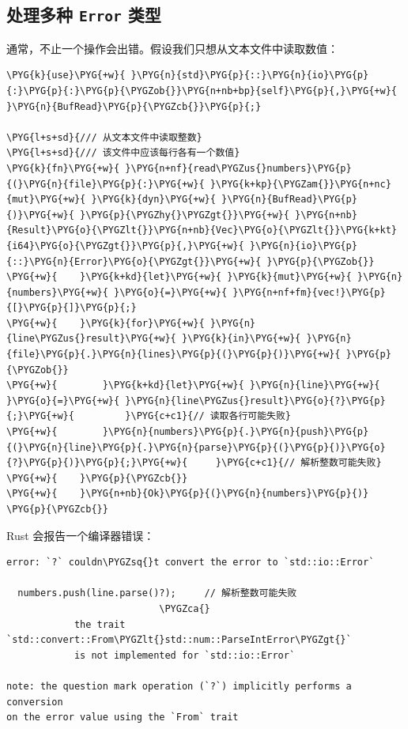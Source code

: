 \subsection{处理多种 \texttt{Error} 类型}

通常，不止一个操作会出错。假设我们只想从文本文件中读取数值：

\begin{Verbatim}[commandchars=\\\{\},breaklines=true,breakanywhere=true,fontsize=\codefont,xleftmargin=17bp]
\PYG{k}{use}\PYG{+w}{ }\PYG{n}{std}\PYG{p}{::}\PYG{n}{io}\PYG{p}{:}\PYG{p}{:}\PYG{p}{\PYGZob{}}\PYG{n+nb+bp}{self}\PYG{p}{,}\PYG{+w}{ }\PYG{n}{BufRead}\PYG{p}{\PYGZcb{}}\PYG{p}{;}

\PYG{l+s+sd}{/// 从文本文件中读取整数}
\PYG{l+s+sd}{/// 该文件中应该每行各有一个数值}
\PYG{k}{fn}\PYG{+w}{ }\PYG{n+nf}{read\PYGZus{}numbers}\PYG{p}{(}\PYG{n}{file}\PYG{p}{:}\PYG{+w}{ }\PYG{k+kp}{\PYGZam{}}\PYG{n+nc}{mut}\PYG{+w}{ }\PYG{k}{dyn}\PYG{+w}{ }\PYG{n}{BufRead}\PYG{p}{)}\PYG{+w}{ }\PYG{p}{\PYGZhy{}\PYGZgt{}}\PYG{+w}{ }\PYG{n+nb}{Result}\PYG{o}{\PYGZlt{}}\PYG{n+nb}{Vec}\PYG{o}{\PYGZlt{}}\PYG{k+kt}{i64}\PYG{o}{\PYGZgt{}}\PYG{p}{,}\PYG{+w}{ }\PYG{n}{io}\PYG{p}{::}\PYG{n}{Error}\PYG{o}{\PYGZgt{}}\PYG{+w}{ }\PYG{p}{\PYGZob{}}
\PYG{+w}{    }\PYG{k+kd}{let}\PYG{+w}{ }\PYG{k}{mut}\PYG{+w}{ }\PYG{n}{numbers}\PYG{+w}{ }\PYG{o}{=}\PYG{+w}{ }\PYG{n+nf+fm}{vec!}\PYG{p}{[}\PYG{p}{]}\PYG{p}{;}
\PYG{+w}{    }\PYG{k}{for}\PYG{+w}{ }\PYG{n}{line\PYGZus{}result}\PYG{+w}{ }\PYG{k}{in}\PYG{+w}{ }\PYG{n}{file}\PYG{p}{.}\PYG{n}{lines}\PYG{p}{(}\PYG{p}{)}\PYG{+w}{ }\PYG{p}{\PYGZob{}}
\PYG{+w}{        }\PYG{k+kd}{let}\PYG{+w}{ }\PYG{n}{line}\PYG{+w}{ }\PYG{o}{=}\PYG{+w}{ }\PYG{n}{line\PYGZus{}result}\PYG{o}{?}\PYG{p}{;}\PYG{+w}{         }\PYG{c+c1}{// 读取各行可能失败}
\PYG{+w}{        }\PYG{n}{numbers}\PYG{p}{.}\PYG{n}{push}\PYG{p}{(}\PYG{n}{line}\PYG{p}{.}\PYG{n}{parse}\PYG{p}{(}\PYG{p}{)}\PYG{o}{?}\PYG{p}{)}\PYG{p}{;}\PYG{+w}{     }\PYG{c+c1}{// 解析整数可能失败}
\PYG{+w}{    }\PYG{p}{\PYGZcb{}}
\PYG{+w}{    }\PYG{n+nb}{Ok}\PYG{p}{(}\PYG{n}{numbers}\PYG{p}{)}
\PYG{p}{\PYGZcb{}}
\end{Verbatim}

Rust 会报告一个编译器错误：

\begin{Verbatim}[commandchars=\\\{\},breaklines=true,breakanywhere=true,fontsize=\codefont,xleftmargin=17bp]
error: `?` couldn\PYGZsq{}t convert the error to `std::io::Error`

  numbers.push(line.parse()?);     // 解析整数可能失败
                           \PYGZca{}
            the trait `std::convert::From\PYGZlt{}std::num::ParseIntError\PYGZgt{}`
            is not implemented for `std::io::Error`

note: the question mark operation (`?`) implicitly performs a conversion
on the error value using the `From` trait
\end{Verbatim}

